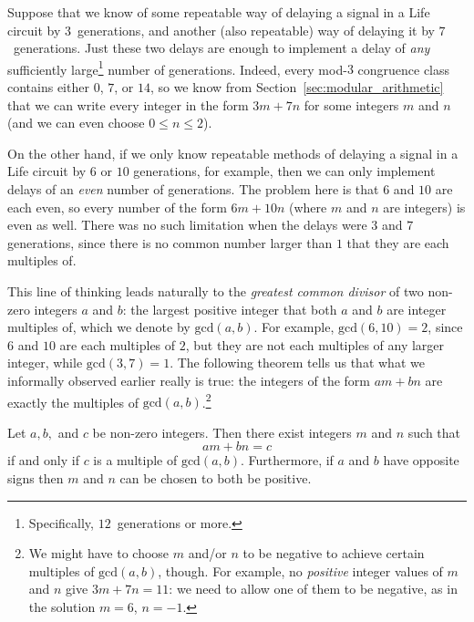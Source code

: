 Suppose that we know of some repeatable way of delaying a signal in a Life circuit by $3$~generations, and another (also repeatable) way of delaying it by $7$~generations. Just these two delays are enough to implement a delay of \emph{any} sufficiently large\footnote{Specifically, $12$~generations or more.} number of generations. Indeed, every mod-$3$ congruence class contains either $0$, $7$, or $14$, so we know from Section~\ref{sec:modular_arithmetic} that we can write every integer in the form $3m + 7n$ for some integers $m$ and $n$ (and we can even choose $0 \leq n \leq 2$).

On the other hand, if we only know repeatable methods of delaying a signal in a Life circuit by $6$ or $10$ generations, for example, then we can only implement delays of an \emph{even} number of generations. The problem here is that $6$ and $10$ are each even, so every number of the form $6m + 10n$ (where $m$ and $n$ are integers) is even as well. There was no such limitation when the delays were $3$ and $7$ generations, since there is no common number larger than $1$ that they are each multiples of.

This line of thinking leads naturally to the \emph{greatest common divisor} of two non-zero integers $a$ and $b$: the largest positive integer that both $a$ and $b$ are integer multiples of, which we denote by $\mathrm{gcd}(a,b)$. For example, $\mathrm{gcd}(6,10) = 2$, since $6$ and $10$ are each multiples of $2$, but they are not each multiples of any larger integer, while $\mathrm{gcd}(3,7) = 1$. The following theorem tells us that what we informally observed earlier really is true: the integers of the form $am + bn$ are exactly the multiples of $\mathrm{gcd}(a,b)$.\footnote{We might have to choose $m$ and/or $n$ to be negative to achieve certain multiples of $\mathrm{gcd}(a,b)$, though. For example, no \emph{positive} integer values of $m$ and $n$ give $3m + 7n = 11$: we need to allow one of them to be negative, as in the solution $m = 6$, $n = -1$.}

\begin{theorem}\label{thm:linear_diophantine}
	Let $a, b,$ and $c$ be non-zero integers. Then there exist integers $m$ and $n$ such that
	\[
		am + bn = c
	\]
	if and only if $c$ is a multiple of $\mathrm{gcd}(a,b)$. Furthermore, if $a$ and $b$ have opposite signs then $m$ and $n$ can be chosen to both be positive.
\end{theorem}

